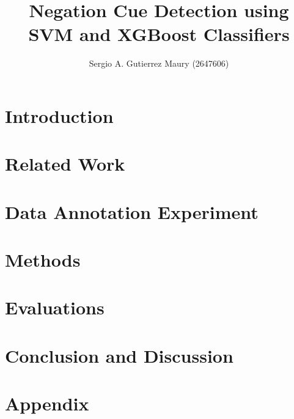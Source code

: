 \documentclass[runningheads]{llncs}
\begin{document}
%
\title{Negation Cue Detection using SVM and XGBoost Classifiers}
%
%
\author{
Sergio A. Gutierrez Maury (2647606)
}
%
%
%
\maketitle              %

\begin{abstract}

\end{abstract}


\section*{Introduction}

\section*{Related Work}

\section*{Data Annotation Experiment}

\section*{Methods}

\section*{Evaluations}

\section*{Conclusion and Discussion}


\newpage
\printbibliography


\appendix
\section{Appendix}
\end{document}
